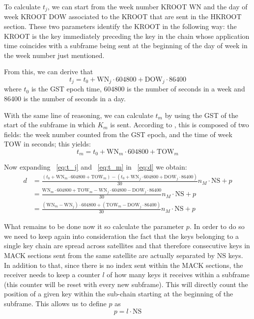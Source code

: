 To calculate $t_j$, we can start from the week number \textrm{KROOT WN} and the
day of week \textrm{KROOT DOW} associated to the KROOT that are sent in the
HKROOT section. These two parameters identify the KROOT in the following way:
the KROOT is the key immediately preceding the key in the chain whose
application time coincides with a subframe being sent at the beginning of the
day of week in the week number just mentioned.

From this, we can derive that
\begin{equation}
  \label{eq:t_j}
  t_j = t_0 + \textrm{WN}_j \cdot 604800 + \textrm{DOW}_j \cdot 86400
\end{equation}
where $t_0$ is the GST epoch time, $604800$ is the number of seconds in a week
and 86400 is the number of seconds in a day.

With the same line of reasoning, we can calculate $t_m$ by using the GST of the
start of the subframe in which $K_m$ is sent. According to \cite{galileoicd},
this is composed of two fields: the week number counted from the GST epoch, and
the time of week $\textrm{TOW}$ in seconds; this yields:
\begin{equation}
  \label{eq:t_m}
  t_m = t_0 + \textrm{WN}_m \cdot 604800 + \textrm{TOW}_m
\end{equation}

Now expanding ~\ref{eq:t_j} and ~\ref{eq:t_m} in ~\ref{eq:d} we obtain:
\begin{equation}
  \label{eq:d2}
  \begin{aligned}
    d &= \frac{(t_0 + \textrm{WN}_m \cdot 604800 + \textrm{TOW}_m) - (t_0 +
    \textrm{WN}_j \cdot 604800 + \textrm{DOW}_j \cdot 86400)}{30} n_M \cdot
    \textrm{NS} + p \\
    &= \frac{\textrm{WN}_m \cdot 604800 + \textrm{TOW}_m - \textrm{WN}_j \cdot
    604800 - \textrm{DOW}_j \cdot 86400}{30} n_M \cdot \textrm{NS} + p \\
    &= \frac{(\textrm{WN}_m - \textrm{WN}_j) \cdot 604800 + (\textrm{TOW}_m -
    \textrm{DOW}_j \cdot 86400)}{30} n_M \cdot \textrm{NS} + p
  \end{aligned}
\end{equation}

What remains to be done now it so calculate the parameter $p$. In order to do
so we need to keep again into consideration the fact that the keys belonging
to a single key chain are spread across satellites and that therefore
consecutive keys in MACK sections sent from the same satellite are actually
separated by $\textrm{NS}$ keys. In addition to that, since there is no index
sent within the MACK sections, the receiver needs to keep a counter $l$ of how
many keys it receives within a subframe (this counter will be reset with every
new subframe). This will directly count the position of a given key within the
sub-chain starting at the beginning of the subframe. This allows us to define
$p$ as
\begin{equation}
  \label{eq:p}
  p = l \cdot \textrm{NS}
\end{equation}

